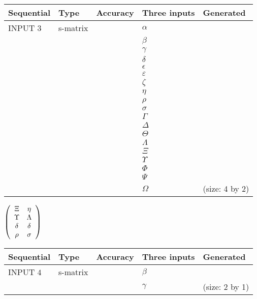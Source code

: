 \documentclass[12pt]{article}
\begin{document}
  
\noindent\begin{tabular}{|l|l|l|l|l|}
\hline
 Sequential & Type & Accuracy & Three inputs & Generated \\ 
\hline
 
 
  INPUT $           3$ & s-matrix & & 
 $  \alpha $ & 
  \\
  & & & 
 $  \beta $ & 
  \\
  & & & 
 $  \gamma $ & 
  \\
  & & & 
 $  \delta $ & 
  \\
  & & & 
 $  \epsilon $ & 
  \\
  & & & 
 $  \varepsilon $ & 
  \\
  & & & 
 $                     \zeta $ & 
  \\
  & & & 
 $  \eta $ & 
  \\
  & & & 
 $  \rho $ & 
  \\
  & & & 
 $  \sigma $ & 
  \\
  & & & 
 $  \Gamma $ & 
  \\
  & & & 
 $  \Delta $ & 
  \\
  & & & 
 $  \Theta $ & 
  \\
  & & & 
 $  \Lambda $ & 
  \\
  & & & 
 $                     \Xi $ & 
  \\
  & & & 
 $  \Upsilon $ & 
  \\
  & & & 
 $  \Phi $ & 
  \\
  & & & 
 $  \Psi $ & 
  \\
  & & & 
 $  \Omega $ & 
  (size:           4 by           2)
 \\  \hline  
 \end{tabular}
   
   
 $  \left( \begin{array}
 {
 c
 c
 }
                    \Xi & 
 \eta \\ 
 \Upsilon & 
 \Lambda \\ 
 \delta & 
 \delta \\ 
 \rho & 
 \sigma
 \end{array} \right) $ 
  
  
\noindent\begin{tabular}{|l|l|l|l|l|}
\hline
 Sequential & Type & Accuracy & Three inputs & Generated \\ 
\hline
 
 
  INPUT $           4$ & s-matrix & & 
 $  \beta $ & 
  \\
  & & & 
 $  \gamma $ & 
  (size:           2 by           1)
 \\  \hline  
 \end{tabular}
   
\end{document}
